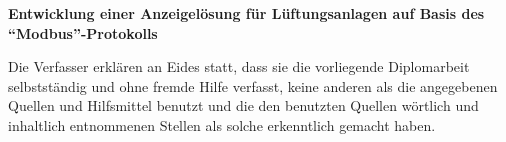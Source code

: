 
\vspace{30pt}

\begin{center}
    \textbf{\LARGE Entwicklung einer Anzeigelösung für Lüftungsanlagen auf Basis des \enquote{Modbus}-Protokolls}
\end{center}

\vspace{30pt}

\noindent Die Verfasser erklären an Eides statt, dass sie die vorliegende Diplomarbeit selbstständig und ohne fremde Hilfe verfasst, keine anderen als die angegebenen Quellen und Hilfsmittel benutzt und die den benutzten Quellen wörtlich und inhaltlich entnommenen Stellen als solche erkenntlich gemacht haben.

\vfill

